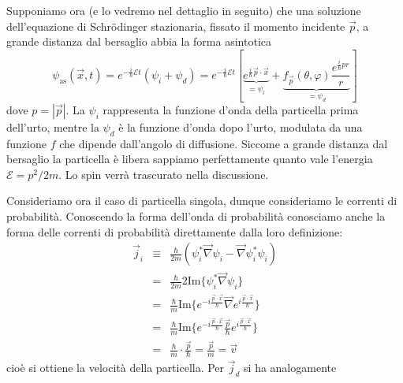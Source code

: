 \documentclass[../../FisicaTeorica.tex]{subfiles}
\begin{document}
Supponiamo ora (e lo vedremo nel dettaglio in seguito) che una soluzione
dell'equazione di Schr{\"o}dinger stazionaria, fissato il momento incidente
$\vec{p}$, a grande distanza dal bersaglio abbia la forma asintotica
\begin{equation}
\label{formaasintotica}
\psi_{\text{as}} (\vec{x}, t) = e^{- \frac{i}{\hbar} \mathcal{E}t} (\psi_i
   + \psi_d) = e^{- \frac{i}{\hbar} \mathcal{E}t}  \left[
   \underbrace{e^{\frac{i}{\hbar}  \vec{p} \cdot \vec{x}}}_{= \psi_i} +
   \underbrace{f_{\vec{p}} (\theta, \varphi) \frac{e^{\frac{i}{\hbar}
   pr}}{r}}_{= \psi_d} \right]
\end{equation}
dove $p = | \vec{p} |$. La $\psi_i$ rappresenta la funzione d'onda della
particella prima dell'urto, mentre la $\psi_d$ {\`e} la funzione d'onda dopo
l'urto, modulata da una funzione $f$ che dipende dall'angolo di diffusione.
Siccome a grande distanza dal bersaglio la particella {\`e} libera sappiamo
perfettamente quanto vale l'energia $\mathcal{E}= p^2 / 2 m$. Lo spin
verr{\`a} trascurato nella discussione.

Consideriamo ora il caso di particella singola, dunque consideriamo le
correnti di probabilit{\`a}. Conoscendo la forma dell'onda di probabilit{\`a}
conosciamo anche la forma delle correnti di probabilit{\`a} direttamente dalla
loro definizione:
\begin{eqnarray*}
  \vec{j}_i & \equiv & \frac{\hbar}{2 m}  (\psi^{\ast}_i  \vec{\nabla} \psi_i
  - \vec{\nabla} \psi_i^{\ast} \psi_i)\\
  & = & \frac{\hbar}{2 m} 2 \text{Im} \{\psi_i^{\ast}  \vec{\nabla} \psi_i
  \}\\
  & = & \frac{\hbar}{m}  \text{Im} \{e^{- i \frac{\vec{p} \cdot
  \vec{x}}{\hbar}}  \vec{\nabla} e^{i \frac{\vec{p} \cdot \vec{x}}{\hbar}}
  \}\\
  & = & \frac{\hbar}{m}  \text{Im} \{e^{- i \frac{\vec{p} \cdot
  \vec{x}}{\hbar}}  \frac{\vec{p}}{\hbar} e^{i \frac{\vec{p} \cdot
  \vec{x}}{\hbar}} \}\\
  & = & \frac{\hbar}{m} \cdot \frac{\vec{p}}{\hbar} = \frac{\vec{p}}{m} =
  \vec{v}
\end{eqnarray*}
cio{\`e} si ottiene la velocit{\`a} della particella. Per $\vec{j}_d$ si ha
analogamente
\end{document}
